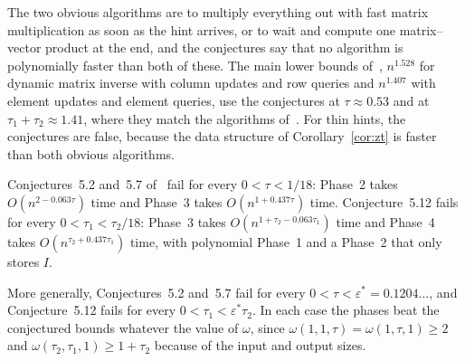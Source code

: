 The two obvious algorithms are to multiply everything out with fast matrix multiplication as soon as the hint arrives, or to wait and compute one matrix--vector product at the end, and the conjectures say that no algorithm is polynomially faster than both of these. The main lower bounds of~\cite{BNS19}, $n^{1.528}$ for dynamic matrix inverse with column updates and row queries and $n^{1.407}$ with element updates and element queries, use the conjectures at $\tau\approx0.53$ and at $\tau_1+\tau_2\approx1.41$, where they match the algorithms of~\cite{BNS19}. For thin hints, the conjectures are false, because the data structure of Corollary~\ref{cor:zt} is faster than both obvious algorithms.

\begin{corollary}\label{cor:bns}
Conjectures~5.2 and~5.7 of~\cite{BNS19} fail for every $0<\tau<1/18$: Phase~2 takes $O(n^{2-0.063\tau})$ time and Phase~3 takes $O(n^{1+0.437\tau})$ time. Conjecture~5.12 fails for every $0<\tau_1<\tau_2/18$: Phase~3 takes $O(n^{1+\tau_2-0.063\tau_1})$ time and Phase~4 takes $O(n^{\tau_2+0.437\tau_1})$ time, with polynomial Phase~1 and a Phase~2 that only stores $I$.

More generally, Conjectures~5.2 and~5.7 fail for every $0<\tau<\varepsilon^*=0.1204\ldots$, and Conjecture~5.12 fails for every $0<\tau_1<\varepsilon^*\tau_2$. In each case the phases beat the conjectured bounds whatever the value of $\omega$, since $\omega(1,1,\tau)=\omega(1,\tau,1)\ge2$ and $\omega(\tau_2,\tau_1,1)\ge1+\tau_2$ because of the input and output sizes.
\end{corollary}
